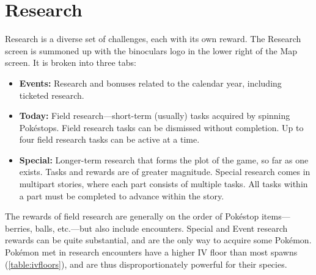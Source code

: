 \section{Research}
\label{sec:research}
Research is a diverse set of challenges, each with its own reward.
The Research screen is summoned up with the binoculars logo in the lower right of the Map screen.
It is broken into three tabs:
\begin{itemize}
  \item \textbf{Events:} Research and bonuses related to the calendar year, including ticketed research.
  \item \textbf{Today:} Field research---short-term (usually) tasks acquired by spinning Pokéstops.
            Field research tasks can be dismissed without completion.
            Up to four field research tasks can be active at a time.
  \item \textbf{Special:} Longer-term research that forms the plot of the game, so far as
            one exists. Tasks and rewards are of greater magnitude.
            Special research comes in multipart stories, where each part consists of multiple tasks.
            All tasks within a part must be completed to advance within the story.
\end{itemize}
The rewards of field research are generally on the order of Pokéstop items---berries, balls,
 etc.---but also include encounters.
Special and Event research rewards can be quite substantial, and are the only way to acquire some Pokémon.
Pokémon met in research encounters have a higher IV floor than most spawns (\autoref{table:ivfloors}),
  and are thus disproportionately powerful for their species.
